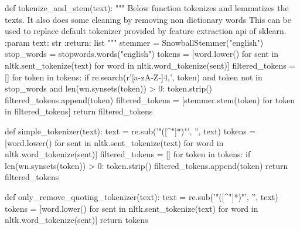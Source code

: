 \begin{lstlisting}[frame=none,caption={Custom tokenizer for TFIDF and BOW.},captionpos=b,label=lst:tokenizers]
\end{lstlisting}
\begin{python}	
	def tokenize_and_stem(text):
		"""
		Below function tokenizes and lemmatizes the texts. It also does some cleaning by removing non dictionary words
		This can be used to replace default tokenizer provided by feature extraction api of sklearn.
		:param text: str
		:return: list
		"""
		stemmer = SnowballStemmer("english")
		stop_words = stopwords.words("english")
		tokens = [word.lower() for sent in nltk.sent_tokenize(text) for word in nltk.word_tokenize(sent)]
		filtered_tokens = []
		for token in tokens:
			if re.search(r'[a-zA-Z-]{4,}', token) and token not in stop_words and len(wn.synsets(token)) > 0:
				token.strip()
				filtered_tokens.append(token)
		filtered_tokens = [stemmer.stem(token) for token in filtered_tokens]
	return filtered_tokens
	
	def simple_tokenizer(text):
		text = re.sub('"([^"]*)"', '', text)
		tokens = [word.lower() for sent in nltk.sent_tokenize(text) for word in nltk.word_tokenize(sent)]
		filtered_tokens = []
		for token in tokens:
			if len(wn.synsets(token)) > 0:
				token.strip()
				filtered_tokens.append(token)
		return filtered_tokens
	
	def only_remove_quoting_tokenizer(text):
		text = re.sub('"([^"]*)"', '', text)
		tokens = [word.lower() for sent in nltk.sent_tokenize(text) for word in nltk.word_tokenize(sent)]
		return tokens
\end{python}


